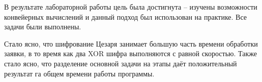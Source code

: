 \Conclusion %
В результате лабораторной работы цель была достигнута -- изучены возможности конвейерных вычислений и данный подход был использован на практике. Все задачи были выполнены.
\par Стало ясно, что шифрование Цезаря занимает большую часть времени обработки заявки, в то время как два XOR шифра выполняются с равной скоростью. Также стало ясно, что разделение основной задачи на этапы даёт положительный результат га общем времени работы программы.